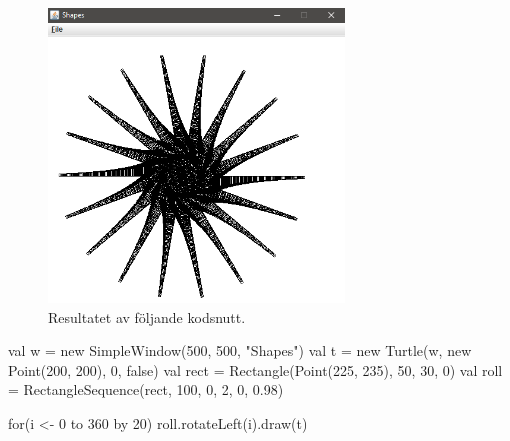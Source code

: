 \begin{figure}[H]
\centering
\includegraphics[width=0.7\textwidth, height = 0.3\pdfpageheight,keepaspectratio]{../img/w06-lab/RectangleSequence.png}
\caption {Resultatet av följande kodsnutt.}
\label{fig:classes:turtlegraphics:rectanglesequence}

\end{figure}
\begin{Code}
val w = new SimpleWindow(500, 500, "Shapes")
val t = new Turtle(w, new Point(200, 200), 0, false)
val rect = Rectangle(Point(225, 235), 50, 30, 0)
val roll = RectangleSequence(rect, 100, 0, 2, 0, 0.98)
     
for(i <- 0 to 360 by 20) 
      roll.rotateLeft(i).draw(t)
 
\end{Code}
